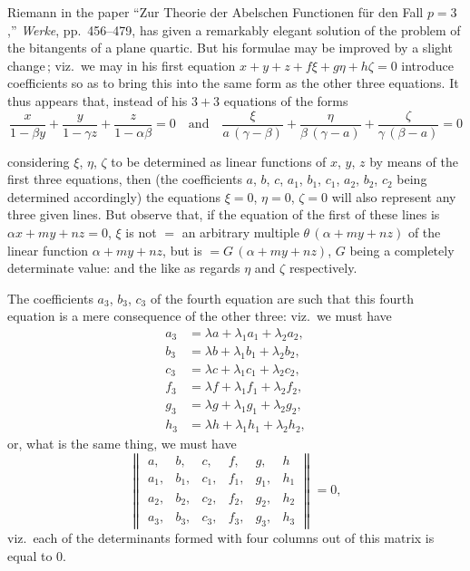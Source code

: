 \documentclass[11pt,a4paper]{article}
\providecommand{\textsc}[1]{{\scshape #1}}
\begin{document}
\medskip
\noindent Riemann in the paper ``Zur Theorie der Abelschen Functionen f\"ur den Fall $p = 3$,'' \textit{Werke}, pp.~456--479, has given a remarkably elegant solution of the problem of the bitangents of a plane quartic.  But his formulae may be improved by a slight change\,; viz.\ we may in his first equation $x + y + z + f\xi + g\eta + h\zeta = 0$ introduce coefficients so as to bring this into the same form as the other three equations.  It thus appears that, instead of his $3 + 3$ equations of the forms
\[
\frac{x}{1 - \beta y} + \frac{y}{1 - \gamma z} + \frac{z}{1 - \alpha\beta} = 0\quad\text{and}\quad \frac{\xi}{a\,(\gamma - \beta)} + \frac{\eta}{\beta\,(\gamma - a)} + \frac{\zeta}{\gamma\,(\beta - a)} = 0
\]
\clearpage

\fancyhead[L]{\small 816]}
\fancyhead[C]{\small\textsc{on the bitangents of a plane quartic.}}

\thispagestyle{plain}
\noindent considering $\xi$, $\eta$, $\zeta$ to be determined as linear functions of $x$, $y$, $z$ by means of the first three equations, then (the coefficients $a$, $b$, $c$, $a_{1}$, $b_{1}$, $c_{1}$, $a_{2}$, $b_{2}$, $c_{2}$ being determined accordingly) the equations $\xi = 0$, $\eta = 0$, $\zeta = 0$ will also represent any three given lines.  But observe that, if the equation of the first of these lines is $\alpha x + my + nz = 0$, $\xi$ is not $=$ an arbitrary multiple $\theta\,(\alpha + my + nz)$ of the linear function $\alpha + my + nz$, but is $= G\,(\alpha + my + nz)$, $G$ being a completely determinate value: and the like as regards $\eta$ and $\zeta$ respectively.

\medskip
The coefficients $a_{3}$, $b_{3}$, $c_{3}$ of the fourth equation are such that this fourth equation is a mere consequence of the other three: viz.\ we must have
\[
\begin{aligned}
a_{3} &= \lambda a + \lambda_{1}a_{1} + \lambda_{2}a_{2},\\
b_{3} &= \lambda b + \lambda_{1}b_{1} + \lambda_{2}b_{2},\\
c_{3} &= \lambda c + \lambda_{1}c_{1} + \lambda_{2}c_{2},\\
f_{3} &= \lambda f + \lambda_{1}f_{1} + \lambda_{2}f_{2},\\
g_{3} &= \lambda g + \lambda_{1}g_{1} + \lambda_{2}g_{2},\\
h_{3} &= \lambda h + \lambda_{1}h_{1} + \lambda_{2}h_{2},
\end{aligned}
\]
or, what is the same thing, we must have
\[
\left\|\begin{array}{cccccc}
a, & b, & c, & f, & g, & h \\
a_{1}, & b_{1}, & c_{1}, & f_{1}, & g_{1}, & h_{1} \\
a_{2}, & b_{2}, & c_{2}, & f_{2}, & g_{2}, & h_{2} \\
a_{3}, & b_{3}, & c_{3}, & f_{3}, & g_{3}, & h_{3}
\end{array}\right\| = 0,
\]
viz.\ each of the determinants formed with four columns out of this matrix is equal to $0$.
\end{document}
